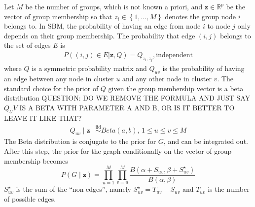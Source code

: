 Let $M$ be the number of groups, which is not known a priori, and $\mathbf{z} \in \mathbb{R}^p$ be the vector of group membership so that $z_i \in \left \{1,\ldots,M \right \}$ denotes the group node $i$ belongs to. In SBM, the probability of having an edge from node $i$ to node $j$ only depends on their group membership. The probability that edge $(i,j)$ belongs to the set of edges $E$ is
\begin{align*}
P((i,j)\in E|\mathbf{z},Q)=Q_{z_i,z_j}, \text{independent}
\end{align*}
where $Q$ is a symmetric probability matrix and $Q_{uv}$ is the probability of having an edge between any node in cluster $u$ and any other node in cluster $v$. The standard choice for the prior of $Q$ given the group membership vector is a beta distribution QUESTION: DO WE REMOVE THE FORMULA AND JUST SAY $Q_UV$ IS A BETA WITH PARAMETER A AND B, OR IS IT BETTER TO LEAVE IT LIKE THAT?
\begin{align*}
    Q_{uv} \mid \mathbf{z} & \overset{\mathrm{iid}}{\sim} Beta(a,b),\, 1\leq u \leq v \leq M
\end{align*}
The Beta distribution is conjugate to the prior for $G$, and can be integrated out. After this step, the prior for the graph conditionally on the vector of group membership becomes
\[
    P(G\mid \mathbf{z})
    =
    \prod_{u=1}^{M}\prod_{v=u}^{M}
    \frac{B(\alpha + S_{uv}, \beta+ S^{\star}_{uv})}{B(\alpha,\beta)}
\]
$S^{\star}_{uv}$ is the sum of the ``non-edges'', namely $S^{\star}_{uv} = T_{uv} - S_{uv}$ and $T_{uv}$ is the number of possible edges. \\       

